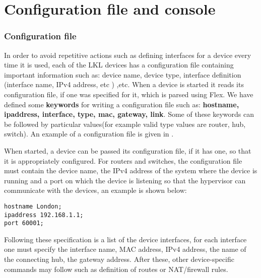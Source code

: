 {{\section{Configuration file and console}
\label{sec:config}

\subsubsection{Configuration file}
\label{subsec:config-file}
In order to avoid repetitive actions such as defining interfaces for a device every time it is used, each 
of the LKL devices has a configuration file containing important information such as: device name, 
device type, interface definition (interface name, IPv4 address, etc ) ,etc. When a device is started it 
reads its configuration file, if one was specified for it, which is parsed using Flex. We have defined some 
\textbf{keywords} for writing a configuration file such as: \textbf{hostname, ipaddress, 
interface, type, mac, gateway, link}. Some of these keywords can be followed by 
particular values(for example valid type values are router, hub, switch). An example of a 
configuration file is given in .

When started, a device can be passed its configuration file, if it has one, 
so that it is appropriately configured. For routers and switches, the configuration 
file must contain the device name, the IPv4 address of the system where the device is running and a port 
on which the device is listening so that the hypervisor can communicate with the devices, an example is shown below:
\lstset{language=TeX,caption=Fields of Configuration File,label=lst:config-file}
\begin{lstlisting}
hostname London;
ipaddress 192.168.1.1;
port 60001;
\end{lstlisting}
Following these specification is a list of the device interfaces, for each interface one must specify 
the interface name, MAC address, IPv4 address, the name of the connecting hub, the gateway address. 
After these, other device-specific commands may follow such as definition of routes or NAT/firewall rules.

}}
